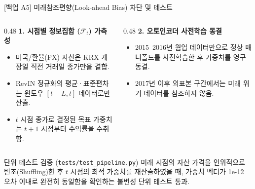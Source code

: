 \begin{frame}{[백업 A5] 미래참조편향(Look-ahead Bias) 차단 및 테스트}
\begin{columns}[T]
  \begin{column}{0.48\textwidth}
    \textbf{1. 시점별 정보집합 ($\mathcal{F}_t$) 가측성}
    \begin{itemize}
      \setlength{\itemsep}{3pt}
      \small
      \item 미국/환율(FX) 자산은 KRX 개장일 직전 거래일 종가만을 결합.
      \item RevIN 정규화의 평균·표준편차는 윈도우 $[t-L, t]$ 데이터로만 산출.
      \item $t$ 시점 종가로 결정된 목표 가중치는 $t+1$ 시점부터 수익률을 수취함.
    \end{itemize}
  \end{column}
  
  \begin{column}{0.48\textwidth}
    \textbf{2. 오토인코더 사전학습 동결}
    \begin{itemize}
      \setlength{\itemsep}{3pt}
      \small
      \item 2015~2016년 웜업 데이터만으로 정상 매니폴드를 사전학습한 후 가중치를 영구 동결.
      \item 2017년 이후 외표본 구간에서는 미래 위기 데이터를 참조하지 않음.
    \end{itemize}
  \end{column}
\end{columns}

\vspace{3mm}
\begin{exampleblock}{단위 테스트 검증 (\texttt{tests/test\_pipeline.py})}
  \small 미래 시점의 자산 가격을 인위적으로 변조(Shuffling)한 후 $t$ 시점의 최적 가중치를 재산출하였을 때, 가중치 벡터가 1e-12 오차 이내로 완전히 동일함을 확인하는 불변성 단위 테스트 통과.
\end{exampleblock}
\end{frame}

